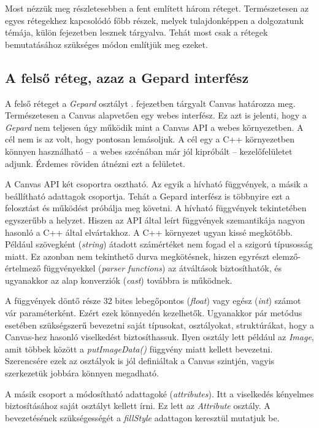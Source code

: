 \documentclass[12pt]{report}
\theoremstyle{definition}
\newcommand{\inenglish}[1]{\textsl{#1}}
\newcommand{\func}[1]{{\textsl{#1}}}
\begin{document}
Most nézzük meg részletesebben a fent említett három réteget. Természetesen az
egyes rétegekhez kapcsolódó főbb részek, melyek tulajdonképpen a dolgozatunk
témája, külön fejezetben lesznek tárgyalva. Tehát most csak a rétegek
bemutatásához szükséges módon említjük meg ezeket.

    \subsection*{A felső réteg, azaz a Gepard interfész}

A felső réteget a \func{Gepard} osztályt . fejezetben tárgyalt
Canvas határozza meg. Természetesen  a Canvas alapvetően egy webes interfész.
Ez azt is jelenti, hogy a \func{Gepard} nem teljesen úgy működik mint a Canvas
API a webes környezetben. A cél nem is az volt, hogy pontosan lemásoljuk. A cél
egy a C++ környezetben könnyen használható -- a webes szcénában már jól
kipróbált -- kezelőfelületet adjunk. Érdemes röviden átnézni ezt a felületet.

A Canvas API két csoportra osztható. Az egyik a hívható függvények, a másik a
beállítható adattagok csoportja. Tehát a Gepard interfész is többnyire ezt a
felosztást és működést próbálja meg követni. A hívható függvények tekintetében
egyszerűbb a helyzet. Hiszen az API által leírt függvények szemantikája nagyon
hasonló a C++ által elvártakhoz. A C++ környezet ugyan kissé megkötőbb. Például
szövegként (\inenglish{string}) átadott számértéket nem fogad el a szigorú
típusosság miatt. Ez azonban nem tekinthető durva megkötésnek, hiszen egyrészt
elemző-értelmező függvényekkel (\inenglish{parser functions}) az átváltások
biztosíthatók, és ugyanakkor az alap konverziók (\inenglish{cast}) továbbra is
működnek.

A függvények döntő része 32 bites lebegőpontos (\func{float}) vagy egész
(\func{int}) számot vár paraméterként. Ezért ezek könnyedén kezelhetők.
Ugyanakkor pár metódus esetében szükségszerű bevezetni saját típusokat,
osztályokat, struktúrákat, hogy a Canvas-hez hasonló viselkedést biztosíthassuk.
Ilyen osztály lett például az \func{Image}, amit többek között a
\func{putImageData()} függvény miatt kellett bevezetni. Szerencsére ezek az
osztályok is jól definiáltak a Canvas szintjén, vagyis szerkezetük jobbára
könnyen megadható.

A másik csoport a módosítható adattagoké (\inenglish{attributes}). Itt a
viselkedés kényelmes biztosításához saját osztályt kellett írni. Ez lett az
\func{Attribute} osztály. A bevezetésének szükségességét a \func{fillStyle}
adattagon keresztül mutatjuk be.
\end{document}
